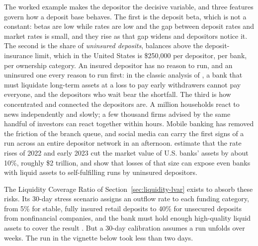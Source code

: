 \documentclass[../ai_in_finance]{subfiles}
\begin{document}
The worked example makes the depositor the decisive variable, and three features govern how a deposit base behaves. The first is the deposit beta, which is not a constant: betas are low while rates are low and the gap between deposit rates and market rates is small, and they rise as that gap widens and depositors notice it.
The second is the share of \emph{uninsured deposits}, balances above the deposit-insurance limit, which in the United States is \$250,000 per depositor, per bank, per ownership category. An insured depositor has no reason to run, and an uninsured one every reason to run first: in the classic analysis of \textcite{diamond1983bank}, a bank that must liquidate long-term assets at a loss to pay early withdrawers cannot pay everyone, and the depositors who wait bear the shortfall.
The third is how concentrated and connected the depositors are. A million households react to news independently and slowly; a few thousand firms advised by the same handful of investors can react together within hours. Mobile banking has removed the friction of the branch queue, and social media can carry the first signs of a run across an entire depositor network in an afternoon. \textcite{jiang2024monetary} estimate that the rate rises of 2022 and early 2023 cut the market value of U.S. banks' assets by about 10\%, roughly \$2 trillion, and show that losses of that size can expose even banks with liquid assets to self-fulfilling runs by uninsured depositors.

The Liquidity Coverage Ratio of Section~\ref{sec:liquidity-lvar} exists to absorb these risks. Its 30-day stress scenario assigns an outflow rate to each funding category, from 5\% for stable, fully insured retail deposits to 40\% for unsecured deposits from nonfinancial companies, and the bank must hold enough high-quality liquid assets to cover the result \parencite{bcbs2013lcr}. But a 30-day calibration assumes a run unfolds over weeks. The run in the vignette below took less than two days.

\label{sec:svb-vignette}
\end{document}
